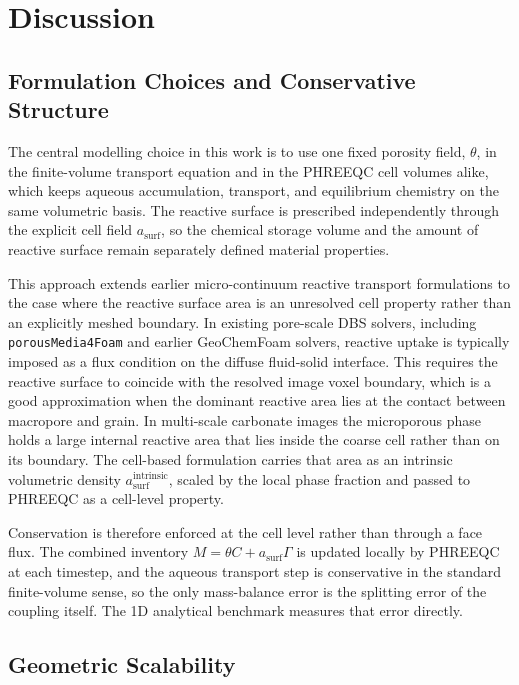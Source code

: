 \section{Discussion}

\subsection{Formulation Choices and Conservative Structure}

The central modelling choice in this work is to use one fixed porosity field,
$\theta$, in the finite-volume transport equation and in the PHREEQC cell
volumes alike, which keeps aqueous accumulation, transport, and equilibrium
chemistry on the same volumetric basis. The reactive surface is prescribed
independently through the explicit cell field $a_{\mathrm{surf}}$, so the
chemical storage volume and the amount of reactive surface remain separately
defined material properties.

This approach extends earlier micro-continuum reactive transport formulations
to the case where the reactive surface area is an unresolved cell property
rather than an explicitly meshed boundary. In existing pore-scale DBS solvers,
including \nolinkurl{porousMedia4Foam} and earlier GeoChemFoam solvers,
reactive uptake is typically imposed as a flux condition on the diffuse
fluid-solid interface. This requires the reactive surface to coincide with the resolved image voxel
boundary, which is a good approximation when the dominant reactive area lies at
the contact between macropore and grain. In multi-scale carbonate images the
microporous phase holds a large internal reactive area that lies inside the
coarse cell rather than on its boundary. The cell-based formulation carries
that area as an intrinsic volumetric density
$a_{\mathrm{surf}}^{\mathrm{intrinsic}}$, scaled by the local phase fraction
and passed to PHREEQC as a cell-level property.

Conservation is therefore enforced at the cell level rather than through a face
flux. The combined inventory $M = \theta C + a_{\mathrm{surf}}\Gamma$ is updated
locally by PHREEQC at each timestep, and the aqueous transport step is
conservative in the standard finite-volume sense, so the only mass-balance
error is the splitting error of the coupling itself. The 1D analytical
benchmark measures that error directly.

\subsection{Geometric Scalability}

